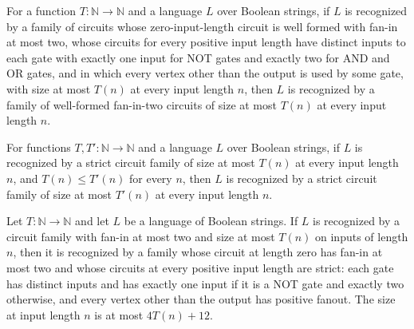 \begin{theorem}
\label{Language.InStrictSIZE.inSIZE}
\leanok
{}
For a function $T : \mathbb{N} \to \mathbb{N}$ and a language $L$ over Boolean strings,
if $L$ is recognized by a family of circuits whose zero-input-length circuit is well
formed with fan-in at most two, whose circuits for every positive input length have
distinct inputs to each gate with exactly one input for NOT gates and exactly two for
AND and OR gates, and in which every vertex other than the output is used by some gate,
with size at most $T(n)$ at every input length $n$, then $L$ is recognized by a family
of well-formed fan-in-two circuits of size at most $T(n)$ at every input length $n$.
\end{theorem}

\begin{theorem}
\label{Language.InStrictSIZE.mono}
\leanok
{}
For functions $T,T' : \mathbb{N} \to \mathbb{N}$ and a language $L$ over Boolean
strings, if $L$ is recognized by a strict circuit family of size at most $T(n)$ at every
input length $n$, and $T(n) \leq T'(n)$ for every $n$, then $L$ is recognized by a
strict circuit family of size at most $T'(n)$ at every input length $n$.
\end{theorem}

\begin{theorem}
\label{Language.InSIZE.inStrictSIZE}
\leanok
{}
Let $T : \mathbb{N} \to \mathbb{N}$ and let $L$ be a language of Boolean strings. If $L$
is recognized by a circuit family with fan-in at most two and size at most $T(n)$ on
inputs of length $n$, then it is recognized by a family whose circuit at length zero has
fan-in at most two and whose circuits at every positive input length are strict: each
gate has distinct inputs and has exactly one input if it is a NOT gate and exactly two
otherwise, and every vertex other than the output has positive fanout. The size at input
length $n$ is at most $4T(n)+12$.
\end{theorem}

